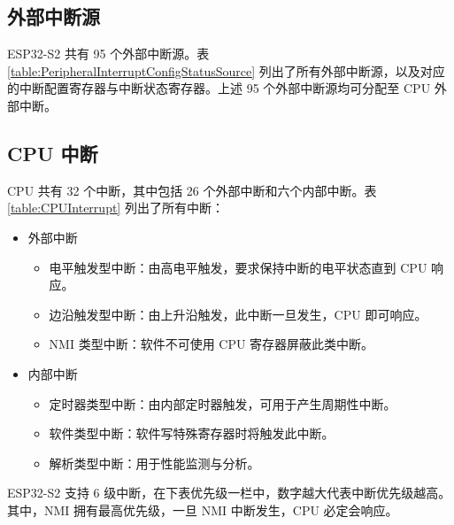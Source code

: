 \documentclass[main\_\_CN.tex]{subfiles}
\begin{document}
\subsection{外部中断源}

ESP32-S2 共有 95 个外部中断源。表 \ref{table:PeripheralInterruptConfigStatusSource} 列出了所有外部中断源，以及对应的中断配置寄存器与中断状态寄存器。上述 95 个外部中断源均可分配至 CPU 外部中断。

\clearpage

\begin{landscape}


\end{landscape}
\restoregeometry

\subsection{CPU 中断}

CPU 共有 32 个中断，其中包括 26 个外部中断和六个内部中断。表 \ref{table:CPUInterrupt} 列出了所有中断：

\begin{itemize}
    \item 外部中断
        \begin{itemize}
            \item 电平触发型中断：由高电平触发，要求保持中断的电平状态直到 CPU 响应。
            \item 边沿触发型中断：由上升沿触发，此中断一旦发生，CPU 即可响应。
            \item NMI 类型中断：软件不可使用 CPU 寄存器屏蔽此类中断。
        \end{itemize}
    \item 内部中断
        \begin{itemize}
            \item 定时器类型中断：由内部定时器触发，可用于产生周期性中断。
            \item 软件类型中断：软件写特殊寄存器时将触发此中断。
            \item 解析类型中断：用于性能监测与分析。
        \end{itemize}
\end{itemize}

ESP32-S2 支持 6 级中断，在下表优先级一栏中，数字越大代表中断优先级越高。其中，NMI 拥有最高优先级，一旦 NMI 中断发生，CPU 必定会响应。


\end{document}

